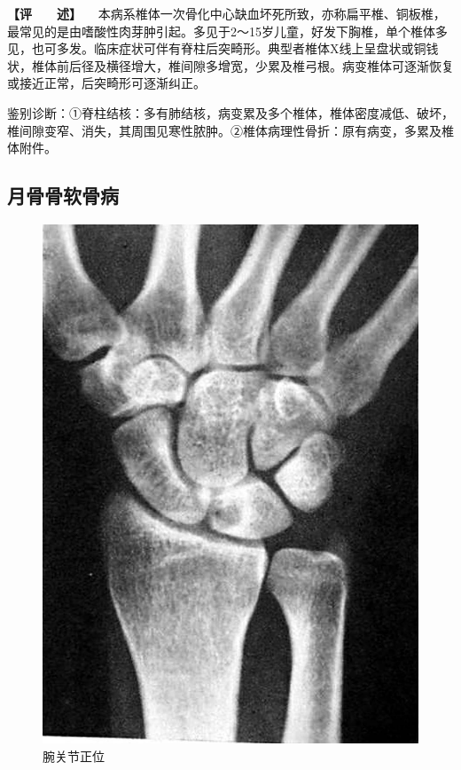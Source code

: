 \textbf{【评　　述】}
　本病系椎体一次骨化中心缺血坏死所致，亦称扁平椎、铜板椎，最常见的是由嗜酸性肉芽肿引起。多见于2～15岁儿童，好发下胸椎，单个椎体多见，也可多发。临床症状可伴有脊柱后突畸形。典型者椎体X线上呈盘状或铜钱状，椎体前后径及横径增大，椎间隙多增宽，少累及椎弓根。病变椎体可逐渐恢复或接近正常，后突畸形可逐渐纠正。

鉴别诊断：①脊柱结核：多有肺结核，病变累及多个椎体，椎体密度减低、破坏，椎间隙变窄、消失，其周围见寒性脓肿。②椎体病理性骨折：原有病变，多累及椎体附件。

\subsection{月骨骨软骨病}

\begin{figure}[!htbp]
 \centering
 \includegraphics{./images/Image00065.jpg}
 \captionsetup{justification=centering}
 \caption{腕关节正位}
 \label{fig2-4-4}
  \end{figure} 

